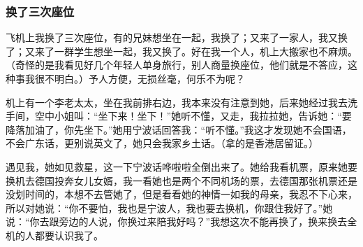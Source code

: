 \subsubsection*{换了三次座位}
\par 飞机上我换了三次座位，有的兄妹想坐在一起，我换了；又来了一家人，我又换了；又来了一群学生想坐一起，我又换了。好在我一个人，机上大搬家也不麻烦。（奇怪的是我看见好几个年轻人单身旅行，别人商量换座位，他们就是不答应，这种事我很不明白。）予人方便，无损丝毫，何乐不为呢？
\par 机上有一个李老太太，坐在我前排右边，我本来没有注意到她，后来她经过我去洗手间，空中小姐叫：“坐下来！坐下！”她听不懂，又走，我拉拉她，告诉她：“要降落加油了，你先坐下。”她用宁波话回答我：“听不懂。”我这才发现她不会国语，不会广东话，更别说英文了，她只会我家乡土话。（拿的是香港居留证。）
\par 遇见我，她如见救星，这一下宁波话哗啦啦全倒出来了。她给我看机票，原来她要换机去德国投奔女儿女婿，我一看她也是两个不同机场的票，去德国那张机票还是没划时间的，本想不去管她了，但是看看她的神情一如我的母亲，我忍不下心来，所以对她说：“你不要怕，我也是宁波人，我也要去换机，你跟住我好了。”她说：“你去跟旁边的人说，你换过来陪我好吗？”我想这次不能再换了，换来换去全机的人都要认识我了。
